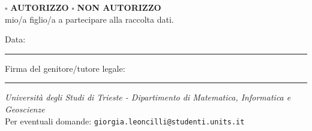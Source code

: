 \documentclass[11pt,a4paper]{article}
\newcommand{\lineamedia}{\rule{5cm}{0.4pt}}
\begin{document}
\vspace{0.5cm}
\begin{center}
$\square$ \textbf{AUTORIZZO} \hspace{1.5cm} $\square$ \textbf{NON AUTORIZZO}\\[6pt]
mio/a figlio/a a partecipare alla raccolta dati.
\end{center}

\vspace{0.7cm}
\noindent
Data: \lineamedia
\hfill
Firma del genitore/tutore legale: \lineamedia
\vspace{2cm}

\begin{flushright}
\footnotesize
\textit{Università degli Studi di Trieste - Dipartimento di Matematica, Informatica e Geoscienze}\\
Per eventuali domande: \texttt{giorgia.leoncilli@studenti.units.it}
\end{flushright}
\end{document}
